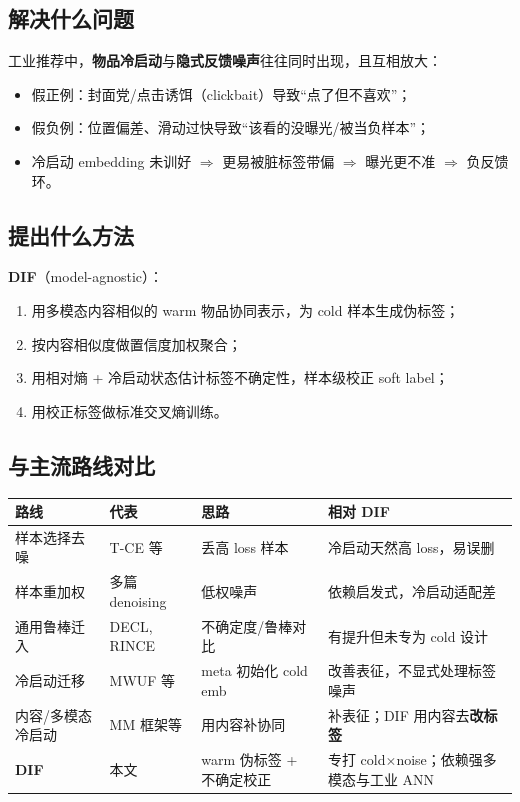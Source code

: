 \documentclass[11pt,a4paper]{ctexart}
\begin{document}
\subsection{解决什么问题}
工业推荐中，\textbf{物品冷启动}与\textbf{隐式反馈噪声}往往同时出现，且互相放大：
\begin{itemize}
  \item 假正例：封面党/点击诱饵（clickbait）导致“点了但不喜欢”；
  \item 假负例：位置偏差、滑动过快导致“该看的没曝光/被当负样本”；
  \item 冷启动 embedding 未训好 $\Rightarrow$ 更易被脏标签带偏 $\Rightarrow$ 曝光更不准 $\Rightarrow$ 负反馈环。
\end{itemize}

\subsection{提出什么方法}
\textbf{DIF}（model-agnostic）：
\begin{enumerate}
  \item 用多模态内容相似的 warm 物品协同表示，为 cold 样本生成伪标签；
  \item 按内容相似度做置信度加权聚合；
  \item 用相对熵 + 冷启动状态估计标签不确定性，样本级校正 soft label；
  \item 用校正标签做标准交叉熵训练。
\end{enumerate}

\subsection{与主流路线对比}
\begin{center}
\small
\begin{tabular}{p{2.4cm}p{3.2cm}p{4.2cm}p{4.5cm}}
\toprule
\textbf{路线} & \textbf{代表} & \textbf{思路} & \textbf{相对 DIF} \\
\midrule
样本选择去噪 & T-CE 等 & 丢高 loss 样本 & 冷启动天然高 loss，易误删 \\
样本重加权 & 多篇 denoising & 低权噪声 & 依赖启发式，冷启动适配差 \\
通用鲁棒迁入 & DECL, RINCE & 不确定度/鲁棒对比 & 有提升但未专为 cold 设计 \\
冷启动迁移 & MWUF 等 & meta 初始化 cold emb & 改善表征，不显式处理标签噪声 \\
内容/多模态冷启动 & MM 框架等 & 用内容补协同 & 补表征；DIF 用内容去\textbf{改标签} \\
\textbf{DIF} & 本文 & warm 伪标签 + 不确定校正 & 专打 cold$\times$noise；依赖强多模态与工业 ANN \\
\bottomrule
\end{tabular}
\end{center}
\end{document}
